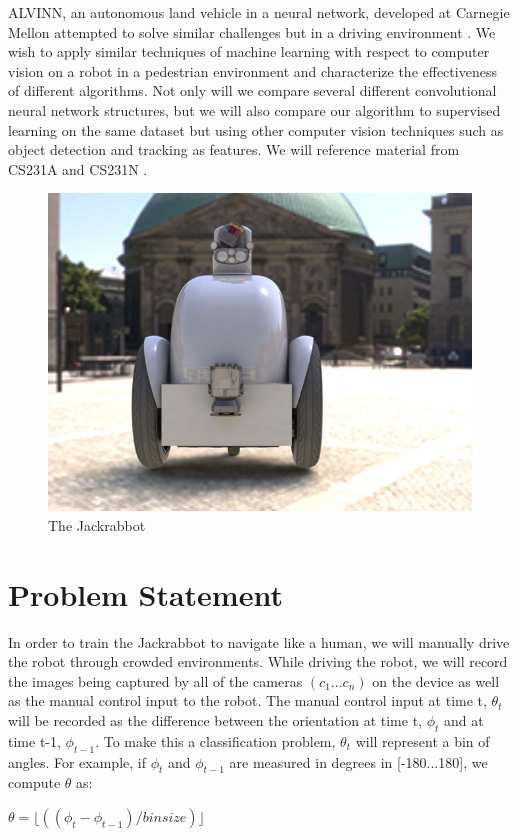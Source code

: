 \documentclass[10pt,twocolumn,letterpaper]{article}
\begin{document}
ALVINN, an autonomous land vehicle in a neural network, developed at Carnegie Mellon attempted to solve similar challenges but in a driving environment \cite{alvinn}. We wish to apply similar techniques of machine learning with respect to computer vision on a robot in a pedestrian environment and characterize the effectiveness of different algorithms.
Not only will we compare several different convolutional neural network structures, but we will also compare our algorithm to supervised learning on the same dataset but using other computer vision techniques such as object detection and tracking as features. We will reference material from CS231A \cite{A1, A2, A3, A4} and CS231N \cite{andrej}.

\begin{figure}[t]
\begin{center}
\includegraphics[width=0.8\linewidth]{pics/PastedGraphic-1.png}
\end{center}
   \caption{The Jackrabbot}
\label{fig:long}
\label{fig:onecol}
\end{figure}

\section{Problem Statement}

In order to train the Jackrabbot to navigate like a human, we will manually drive the robot through crowded environments. While driving the robot, we will record the images being captured by all of the cameras $(c_1...c_n)$ on the device as well as the manual control input to the robot. The manual control input at time t, $\theta_t$ will be recorded as the difference between the orientation at time t, $\phi_t$ and at time t-1, $\phi_{t-1}$. To make this a classification problem, $\theta_t$ will represent a bin of angles. For example, if $\phi_t$ and $\phi_{t-1}$ are measured in degrees in [-180...180], we compute $\theta$ as: 
\begin{center} 
$\theta = \lfloor((\phi_t - \phi_{t-1}) / binsize)\rfloor$
\end{center}
\end{document}
